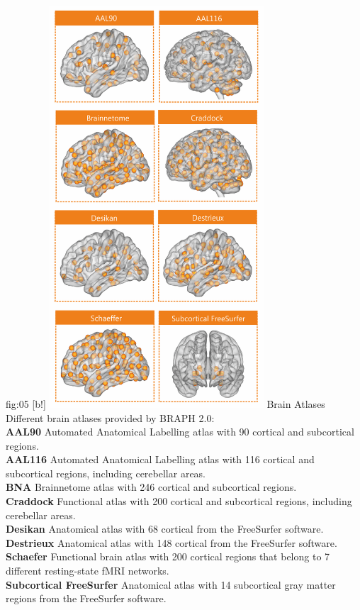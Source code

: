 \documentclass[justified]{tufte-handout}
\begin{document}
	{fig:05}
	{
	[b!]
	\includegraphics[height=15cm]{tut_ba/fig05.png}
	}
	{Brain Atlases}
	{
	Different brain atlases provided by BRAPH 2.0: \\
	{\bf AAL90} Automated Anatomical Labelling atlas with 90 cortical and subcortical regions.\\
	{\bf AAL116} Automated Anatomical Labelling atlas with 116 cortical and subcortical regions, including cerebellar areas.\\
	{\bf BNA} Brainnetome atlas with 246 cortical and subcortical regions.\\
	{\bf Craddock} Functional atlas with 200 cortical and subcortical regions, including cerebellar areas.\\
	{\bf Desikan} Anatomical atlas with 68 cortical from the FreeSurfer software.\\
	{\bf Destrieux} Anatomical atlas with 148 cortical from the FreeSurfer software.\\
	{\bf Schaefer} Functional brain atlas with 200 cortical regions that belong to 7 different resting-state fMRI networks.\\
	{\bf Subcortical FreeSurfer} Anatomical atlas with 14 subcortical gray matter regions from the FreeSurfer software.
	}
\end{document}
